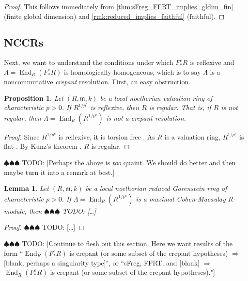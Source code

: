 \documentclass{amsart}
\newtheorem{lem}[thm]{Lemma}
\newtheorem{prop}[thm]{Proposition}
\theoremstyle{definition}
\def\fm{\mathfrak{m}}
\DeclareMathOperator{\End}{\operatorname{End}}
\newcommand{\Fe}{F_{*}^{e}}
\newcommand{\Rpe}{R^{1/p^{e}}}
\newcommand{\todo}[1]{{\color{teal} \sf $\spadesuit\spadesuit\spadesuit$ TODO: [#1]}}
\begin{document}
\bigbreak

\begin{proof}
This follows immediately from \cref{thm:sFreg_FFRT_implies_gldim_fin} (finite global dimension) and \cref{rmk:reduced_implies_faithful} (faithful).
\end{proof}

\bigbreak

\subsection{NCCRs}\label{subsec:sFreg_FFRT_NCCR}

Next, we want to understand the conditions under which $\Fe R$ is reflexive and $\Lambda=\End_{R}(\Fe R)$ is homologically homogeneous, which is to say $\Lambda$ is a noncommutative \emph{crepant} resolution. First, an easy obstruction.

\bigbreak

\begin{prop}
Let $(R,\fm,k)$ be a local noetherian valuation ring of characteristic $p>0$. If $\Rpe$ is reflexive, then $R$ is regular. That is, if $R$ is not regular, then $\Lambda=\End_{R}(\Rpe)$ is not a crepant resolution.
\end{prop}

\bigbreak

\begin{proof}
Since $\Rpe$ is reflexive, it is torsion free \cite[Tag 0AV0]{SP}. As $R$ is a valuation ring, $\Rpe$ is flat \cite[Tag 0539]{SP}. By Kunz's theorem \cite[Thm.\ 2.1]{Kun69}, $R$ is regular.
\end{proof}

\bigbreak

\todo{Perhaps the above is \emph{too} quaint. We should do better and then maybe turn it into a remark at best.}

\bigbreak 

\begin{lem}
Let $(R,\fm,k)$ be a local noetherian reduced Gorenstein ring of characteristic $p>0$. If $\Lambda=\End_{R}(\Rpe)$ is a maximal Cohen-Macaulay $R$-module, then \todo{\ldots}
\end{lem}

\bigbreak

\begin{proof}
\todo{\ldots}
\end{proof}

\bigbreak

\todo{Continue to flesh out this section. Here we want results of the form ``$\End_{R}(\Fe R)$ is crepant (or some subset of the crepant hypotheses) $\Rightarrow$ [blank, perhaps a singularity type]", or ``sFreg, FFRT, and [blank] $\Rightarrow$ $\End_{R}(\Fe R)$ is crepant (or some subset of the crepant hypotheses)."}
\end{document}
